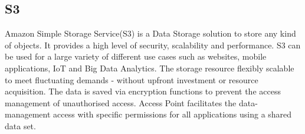 \subsection{S3}
Amazon Simple Storage Service(S3) is a Data Storage solution to store any kind of objects. It provides a high level of security, scalability and performance. S3 can be used for a large variety of different use cases such as websites, mobile applications, IoT and Big Data Analytics. The storage resource flexibly scalable to meet fluctuating demands - without upfront investment or resource acquisition. The data is saved via encryption functions to prevent the access management of unauthorised access. Access Point facilitates the data-management access with specific permissions for all applications using a shared data set.
